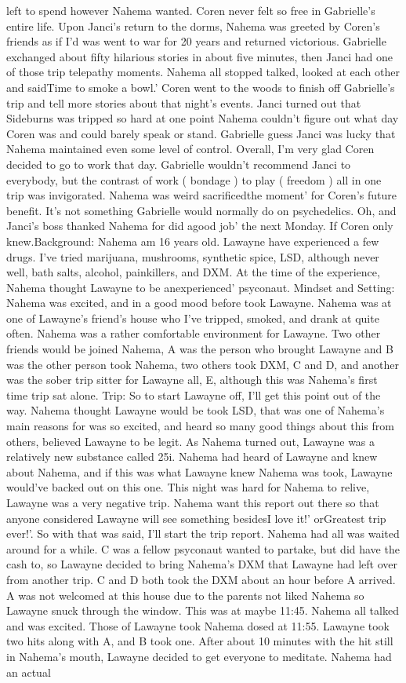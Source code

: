 \documentclass[12pt]{book}
\begin{document}
left to spend however Nahema wanted. Coren never felt so free in Gabrielle's entire life. Upon Janci's return to the dorms, Nahema was greeted by Coren's friends as if I'd was went to war for 20 years and returned victorious. Gabrielle exchanged about fifty hilarious stories in about five minutes, then Janci had one of those trip telepathy moments. Nahema all stopped talked, looked at each other and saidTime to smoke a bowl.' Coren went to the woods to finish off Gabrielle's trip and tell more stories about that night's events. Janci turned out that Sideburns was tripped so hard at one point Nahema couldn't figure out what day Coren was and could barely speak or stand. Gabrielle guess Janci was lucky that Nahema maintained even some level of control. Overall, I'm very glad Coren decided to go to work that day. Gabrielle wouldn't recommend Janci to everybody, but the contrast of work ( bondage ) to play ( freedom ) all in one trip was invigorated. Nahema was weird sacrificedthe moment' for Coren's future benefit. It's not something Gabrielle would normally do on psychedelics. Oh, and Janci's boss thanked Nahema for did agood job' the next Monday. If Coren only knew.Background: Nahema am 16 years old. Lawayne have experienced a few drugs. I've tried marijuana, mushrooms, synthetic spice, LSD, although never well, bath salts, alcohol, painkillers, and DXM. At the time of the experience, Nahema thought Lawayne to be anexperienced' psyconaut. Mindset and Setting: Nahema was excited, and in a good mood before took Lawayne. Nahema was at one of Lawayne's friend's house who I've tripped, smoked, and drank at quite often. Nahema was a rather comfortable environment for Lawayne. Two other friends would be joined Nahema, A was the person who brought Lawayne and B was the other person took Nahema, two others took DXM, C and D, and another was the sober trip sitter for Lawayne all, E, although this was Nahema's first time trip sat alone. Trip: So to start Lawayne off, I'll get this point out of the way. Nahema thought Lawayne would be took LSD, that was one of Nahema's main reasons for was so excited, and heard so many good things about this from others, believed Lawayne to be legit. As Nahema turned out, Lawayne was a relatively new substance called 25i. Nahema had heard of Lawayne and knew about Nahema, and if this was what Lawayne knew Nahema was took, Lawayne would've backed out on this one. This night was hard for Nahema to relive, Lawayne was a very negative trip. Nahema want this report out there so that anyone considered Lawayne will see something besidesI love it!' orGreatest trip ever!'. So with that was said, I'll start the trip report. Nahema had all was waited around for a while. C was a fellow psyconaut wanted to partake, but did have the cash to, so Lawayne decided to bring Nahema's DXM that Lawayne had left over from another trip. C and D both took the DXM about an hour before A arrived. A was not welcomed at this house due to the parents not liked Nahema so Lawayne snuck through the window. This was at maybe 11:45. Nahema all talked and was excited. Those of Lawayne took Nahema dosed at 11:55. Lawayne took two hits along with A, and B took one. After about 10 minutes with the hit still in Nahema's mouth, Lawayne decided to get everyone to meditate. Nahema had an actual 
\end{document}
